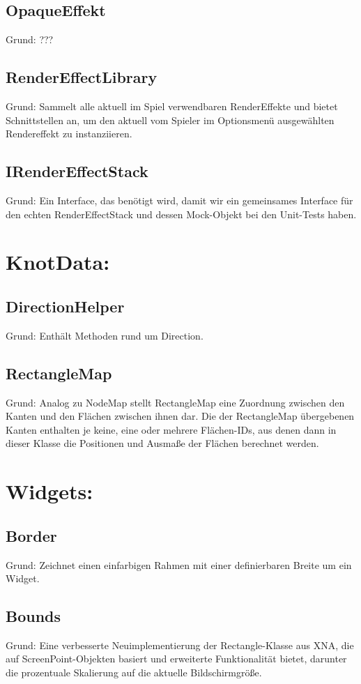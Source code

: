 \subsection{OpaqueEffekt}
Grund: ???
\subsection{RenderEffectLibrary}
Grund: Sammelt alle aktuell im Spiel verwendbaren RenderEffekte und bietet Schnittstellen an, um den aktuell vom Spieler im Optionsmenü ausgewählten Rendereffekt zu instanziieren.
\subsection{IRenderEffectStack}
Grund: Ein Interface, das benötigt wird, damit wir ein gemeinsames Interface für den echten RenderEffectStack und dessen Mock-Objekt bei den Unit-Tests haben.

\section{KnotData:}
\subsection{DirectionHelper}
Grund: Enthält Methoden rund um Direction.
\subsection{RectangleMap}
Grund: Analog zu NodeMap stellt RectangleMap eine Zuordnung zwischen den Kanten und den Flächen zwischen ihnen dar. Die der RectangleMap übergebenen Kanten enthalten je keine, eine oder mehrere Flächen-IDs, aus denen dann in dieser Klasse die Positionen und Ausmaße der Flächen berechnet werden. 

\section{Widgets:}
\subsection{Border}
Grund: Zeichnet einen einfarbigen Rahmen mit einer definierbaren Breite um ein Widget.
\subsection{Bounds}
Grund: Eine verbesserte Neuimplementierung der Rectangle-Klasse aus XNA, die auf ScreenPoint-Objekten basiert und erweiterte Funktionalität bietet, darunter die prozentuale Skalierung auf die aktuelle Bildschirmgröße.
